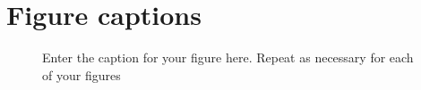 \documentclass[utf8]{FrontiersinHarvard} %
\begin{document}

\nocite{*}


\section*{Figure captions}


\begin{figure}[h!]
\begin{center}
\end{center}
\caption{ Enter the caption for your figure here.  Repeat as  necessary for each of your figures}\label{fig:1}
\end{figure}
\end{document}
